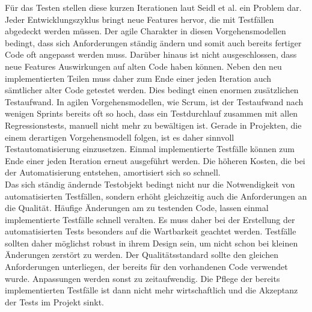 Für das Testen stellen diese kurzen Iterationen laut  Seidl et al. \cite[vgl. S.24]{seidl_basiswissen_2012} ein Problem dar.
Jeder Entwicklungszyklus bringt neue Features hervor, die mit Testfällen abgedeckt werden müssen. Der agile Charakter in diesen Vorgehensmodellen bedingt, dass sich Anforderungen ständig ändern und somit auch bereits fertiger Code oft angepasst werden muss. Darüber hinaus ist nicht ausgeschlossen, dass neue Features Auswirkungen auf alten Code haben können. Neben den neu implementierten Teilen muss daher zum Ende einer jeden Iteration auch sämtlicher alter Code getestet werden.
Dies bedingt einen enormen zusätzlichen Testaufwand. 
In agilen Vorgehensmodellen, wie Scrum, ist der Testaufwand nach wenigen Sprints bereits oft so hoch, dass ein Testdurchlauf zusammen mit allen Regressionstests, manuell nicht mehr zu bewältigen ist.
Gerade in Projekten, die einem derartigen Vorgehensmodell folgen, ist es daher sinnvoll Testautomatisierung einzusetzen. Einmal implementierte Testfälle können zum Ende einer jeden Iteration erneut ausgeführt werden. Die höheren Kosten, die bei der Automatisierung entstehen, amortisiert sich so schnell.\\
Das sich ständig ändernde Testobjekt bedingt nicht nur die Notwendigkeit von automatisierten Testfällen, sondern erhöht gleichzeitig auch die Anforderungen an die Qualität. Häufige Änderungen am zu testenden Code, lassen einmal implementierte Testfälle schnell veralten. Es muss daher bei der Erstellung der automatisierten Tests besonders auf die Wartbarkeit geachtet werden.
Testfälle sollten daher möglichst robust in ihrem Design sein, um nicht schon bei kleinen Änderungen zerstört zu werden. Der Qualitätsstandard sollte den gleichen Anforderungen unterliegen, der bereits für den vorhandenen Code verwendet wurde. Anpassungen werden sonst zu zeitaufwendig. Die Pflege der bereits implementierten Testfälle ist dann nicht mehr wirtschaftlich und die Akzeptanz der Tests im Projekt sinkt.
